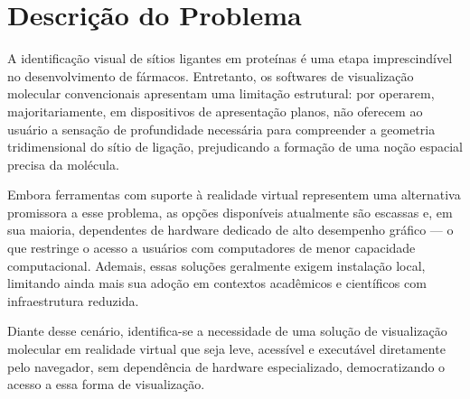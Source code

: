 \section{Descrição do Problema}\label{sec:descricao_do_problema}

A identificação visual de sítios ligantes em proteínas é uma etapa imprescindível no desenvolvimento de fármacos. Entretanto, os softwares de visualização molecular convencionais apresentam uma limitação estrutural: por operarem, majoritariamente, em dispositivos de apresentação planos, não oferecem ao usuário a sensação de profundidade necessária para compreender a geometria tridimensional do sítio de ligação, prejudicando a formação de uma noção espacial precisa da molécula.

Embora ferramentas com suporte à realidade virtual representem uma alternativa promissora a esse problema, as opções disponíveis atualmente são escassas e, em sua maioria, dependentes de hardware dedicado de alto desempenho gráfico — o que restringe o acesso a usuários com computadores de menor capacidade computacional. Ademais, essas soluções geralmente exigem instalação local, limitando ainda mais sua adoção em contextos acadêmicos e científicos com infraestrutura reduzida.

Diante desse cenário, identifica-se a necessidade de uma solução de visualização molecular em realidade virtual que seja leve, acessível e executável diretamente pelo navegador, sem dependência de hardware especializado, democratizando o acesso a essa forma de visualização.